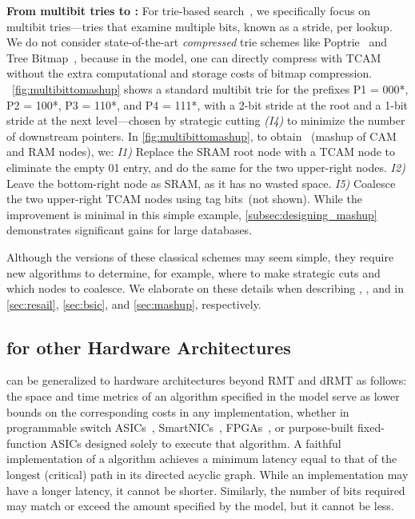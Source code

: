 \textbf{From multibit tries to \mashup:} For trie-based search~\cite{prefix_expansion, lctrie, lulea, indira, flashtrie, tree_bitmap, poptrie}, we specifically focus on multibit tries---tries that examine multiple bits, known as a stride, per lookup. We do not consider state-of-the-art {\em compressed} trie schemes like Poptrie~\cite{poptrie} and Tree Bitmap~\cite{tree_bitmap}, because in the \cram model, one can directly compress with TCAM without the extra computational and storage costs of bitmap compression. ~\cref{fig:multibittomashup} shows a standard multibit trie for the prefixes P1 = 000*, P2 = 100*, P3 = 110*, and P4 = 111*, with a 2-bit stride at the root and a 1-bit stride at the next level---chosen by strategic cutting {\em (I4)} to minimize the number of downstream pointers. In \cref{fig:multibittomashup}, to obtain \mashup~(mashup of CAM and RAM nodes), we: {\em I1)} Replace the SRAM root node with a TCAM node to eliminate the empty 01 entry, and do the same for the two upper-right nodes. {\em I2)} Leave the bottom-right node as SRAM, as it has no wasted space. {\em I5)} Coalesce the two upper-right TCAM nodes using tag bits~(not shown). While the improvement is minimal in this simple example, \cref{subsec:designing_mashup} demonstrates significant gains for large databases.

Although the \cram versions of these classical schemes may seem simple, they require new algorithms to determine, for example, where to make strategic cuts and which nodes to coalesce. We elaborate on these details when describing \resail, \bsic, and \mashup in \cref{sec:resail}, \cref{sec:bsic}, and \cref{sec:mashup}, respectively.

\subsection{\cram for other Hardware Architectures}\label{subsec:other_architectures}

\cram can be generalized to hardware architectures beyond RMT and dRMT as follows: the space and time metrics of an algorithm specified in the \cram model serve as lower bounds on the corresponding costs in any implementation, whether in programmable switch ASICs~\cite{intel_tofino, cisco_silicon_one, nvidia_spectrum, marvell_teralynx}, SmartNICs~\cite{intel_ipu, amd_pensando, nvidia_bluefield}, FPGAs~\cite{intel_fpga, amd_fpga}, or purpose-built fixed-function ASICs designed solely to execute that algorithm. A faithful implementation of a \cram algorithm achieves a minimum latency equal to that of the longest (critical) path in its directed acyclic graph. While an implementation may have a longer latency, it cannot be shorter. Similarly, the number of bits required may match or exceed the amount specified by the \cram model, but it cannot be less.


